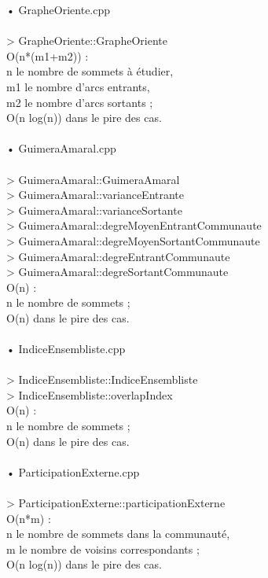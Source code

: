 \begin{titlepage}
{• GrapheOriente.cpp
 \\ \\
> GrapheOriente::GrapheOriente \\
O(n*(m1+m2)) : \\
n le nombre de sommets à étudier, \\
m1 le nombre d'arcs entrants, \\
m2 le nombre d'arcs sortants ; \\
O(n log(n)) dans le pire des cas. \\ \\

• GuimeraAmaral.cpp
 \\  \\
> GuimeraAmaral::GuimeraAmaral \\
> GuimeraAmaral::varianceEntrante \\
> GuimeraAmaral::varianceSortante \\
> GuimeraAmaral::degreMoyenEntrantCommunaute \\
> GuimeraAmaral::degreMoyenSortantCommunaute \\
> GuimeraAmaral::degreEntrantCommunaute \\
> GuimeraAmaral::degreSortantCommunaute \\
O(n) : \\
n le nombre de sommets ; \\
O(n) dans le pire des cas. \\ \\

• IndiceEnsembliste.cpp
 \\  \\
> IndiceEnsembliste::IndiceEnsembliste \\
> IndiceEnsembliste::overlapIndex \\
O(n) : \\
n le nombre de sommets ; \\
O(n) dans le pire des cas. \\ \\

• ParticipationExterne.cpp
 \\  \\
> ParticipationExterne::participationExterne \\
O(n*m) : \\
n le nombre de sommets dans la communauté, \\
m le nombre de voisins correspondants ; \\
O(n log(n)) dans le pire des cas. \\ \\

}
\end{titlepage}
